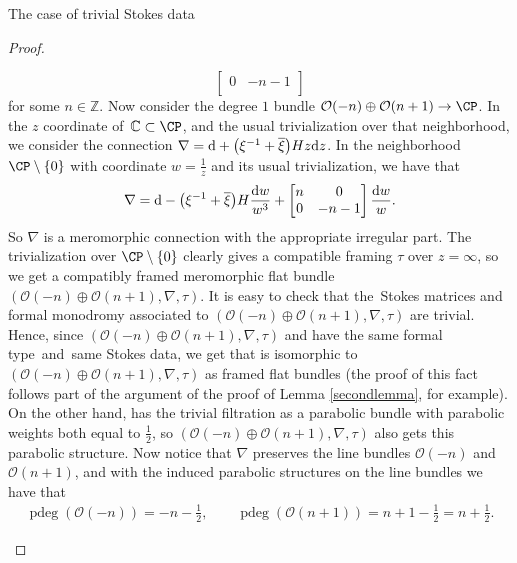 \begin{subsubsection}{The case of trivial Stokes data}
\begin{proof}
\begin{itemize}
\begin{equation*}
\begin{bmatrix}
 0 & -n-1\\ \end{bmatrix}
\end{equation*}
for some $n \in \mathbb{Z}$.
Now consider the degree $1$ bundle $\mathcal{O}(-n)\oplus \mathcal{O}(n+1)\to \CP$. In the $z$ coordinate of~${\mathbb{C}\subset \CP}$, and the usual trivialization over that neighborhood, we consider the connection
$
 \nabla= {\rm d} +\bigl(\xi^{-1}+\overline{\xi}\bigr)Hz{\rm d}z$.
In the neighborhood $\CP \setminus\{0\}$ with coordinate $w=\frac{1}{z}$ and its usual trivialization, we have that
\begin{equation*}
 \nabla= {\rm d} -\bigl(\xi^{-1}+\overline{\xi}\bigr)H\frac{{\rm d}w}{w^3} +\begin{bmatrix} n & 0\\
 0 & -n-1 \\ \end{bmatrix}\frac{{\rm d}w}{w}.
\end{equation*}
So $\nabla$ is a meromorphic connection with the appropriate irregular part. The trivialization over $\CP\setminus\{0\}$ clearly gives a compatible framing $\tau$ over $z=\infty$, so we get a compatibly framed meromorphic flat bundle $(\mathcal{O}(-n)\oplus \mathcal{O}(n+1),\nabla,\tau)$.
It is easy to check that the~Stokes matrices and formal monodromy associated to $(\mathcal{O}(-n)\oplus \mathcal{O}(n+1),\nabla,\tau)$ are trivial. Hence, since $(\mathcal{O}(-n)\oplus \mathcal{O}(n+1),\nabla,\tau)$ and  have the same formal type~and~same Stokes data, we get that  is isomorphic to $(\mathcal{O}(-n)\oplus \mathcal{O}({n+1}),\allowbreak\nabla,\tau)$ as framed flat bundles (the proof of this fact follows part of the argument of the proof of Lemma \ref{secondlemma}, for example).
On the other hand,  has the trivial filtration as a parabolic bundle with parabolic weights both equal to $\frac12$, so $(\mathcal{O}(-n)\oplus \mathcal{O}(n+1),\nabla,\tau)$ also gets this parabolic structure. Now notice that $\nabla$ preserves the line bundles $\mathcal{O}(-n)$ and $\mathcal{O}(n+1)$, and with the induced parabolic structures on the line bundles we have that
\begin{gather*}
 \operatorname{pdeg}(\mathcal{O}(-n))=-n-\frac{1}{2},\qquad
 \operatorname{pdeg}(\mathcal{O}(n+1))=n+1-\frac{1}{2}=n+\frac{1}{2}.

\end{gather*}
\end{itemize}
\end{proof}
\end{subsubsection}
